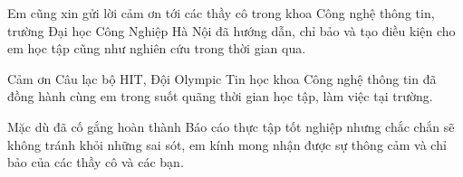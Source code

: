Em cũng xin gửi lời cảm ơn tới các thầy cô trong khoa Công nghệ thông tin,
trường Đại học Công Nghiệp Hà Nội đã hướng dẫn, chỉ bảo và tạo điều kiện cho em
học tập cũng như nghiên cứu trong thời gian qua.

Cảm ơn Câu lạc bộ HIT, Đội Olympic Tin học khoa Công nghệ thông tin đã đồng hành 
cùng em trong suốt quãng thời gian học tập, làm việc tại trường.

Mặc dù đã cố gắng hoàn thành Báo cáo thực tập tốt nghiệp nhưng chắc chắn
sẽ không tránh khỏi những sai sót, em kính mong nhận được sự thông cảm và chỉ
bảo của các thầy cô và các bạn.


